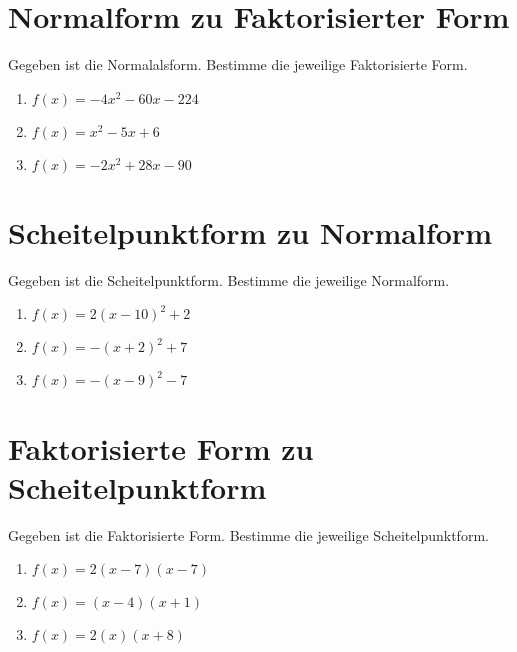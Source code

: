 \documentclass{article}%
\begin{document}
%
\section{Normalform zu Faktorisierter Form}%
\label{sec:NormalformzuFaktorisierterForm}%
Gegeben ist die Normalalsform. Bestimme die jeweilige Faktorisierte Form.%
\begin{enumerate}[label=\alph*)]%
\item%
\newline\vspace{0.5cm} $f(x)=-4x^2 - 60x - 224$%
\item%
\newline\vspace{0.5cm} $f(x)=x^2 - 5x + 6$%
\item%
\newline\vspace{0.5cm} $f(x)=-2x^2 + 28x - 90$%
\end{enumerate}

%
\section{Scheitelpunktform zu Normalform}%
\label{sec:ScheitelpunktformzuNormalform}%
Gegeben ist die Scheitelpunktform. Bestimme die jeweilige Normalform.%
\begin{enumerate}[label=\alph*)]%
\item%
\newline\vspace{0.5cm} $f(x)=2(x-10)^2 +2$%
\item%
\newline\vspace{0.5cm} $f(x)=-(x+2)^2 +7$%
\item%
\newline\vspace{0.5cm} $f(x)=-(x-9)^2 -7$%
\end{enumerate}

%
\section{Faktorisierte Form zu Scheitelpunktform}%
\label{sec:FaktorisierteFormzuScheitelpunktform}%
Gegeben ist die Faktorisierte Form. Bestimme die jeweilige Scheitelpunktform.%
\begin{enumerate}[label=\alph*)]%
\item%
\newline\vspace{0.5cm} $f(x)=2(x-7)(x-7)$%
\item%
\newline\vspace{0.5cm} $f(x)=(x-4)(x+1)$%
\item%
\newline\vspace{0.5cm} $f(x)=2(x)(x+8)$%
\end{enumerate}
\end{document}
